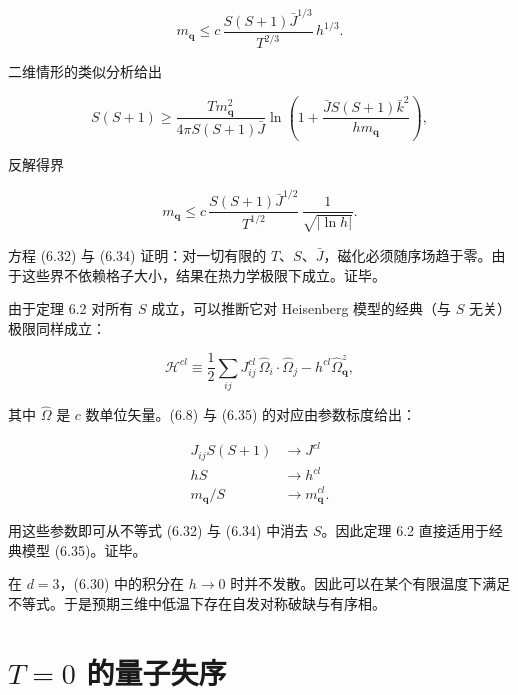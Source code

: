 \begin{equation*}
m _ {\mathbf {q}} \leq c \, \frac {S ( S + 1 ) \bar {J} ^ {1/3}}{T ^ {2/3}} \, h ^ {1/3}.
\tag{6.32}
\end{equation*}

二维情形的类似分析给出

\begin{equation*}
S ( S + 1 ) \geq \frac {T m _ {\mathbf {q}} ^ {2}}{4 \pi S ( S + 1 ) \bar {J}} \ln \left( 1 + \frac {\bar {J} S ( S + 1 ) \bar {k} ^ {2}}{h m _ {\mathbf {q}}} \right) ,
\tag{6.33}
\end{equation*}

反解得界

\begin{equation*}
m _ {\mathbf {q}} \leq c \, \frac {S ( S + 1 ) \bar {J} ^ {1/2}}{T ^ {1/2}} \, \frac {1}{\sqrt {| \ln h |}}.
\tag{6.34}
\end{equation*}

方程 (6.32) 与 (6.34) 证明：对一切有限的 $T$、$S$、$\bar{J}$，磁化必须随序场趋于零。由于这些界不依赖格子大小，结果在热力学极限下成立。证毕。

由于定理 6.2 对所有 $S$ 成立，可以推断它对 Heisenberg 模型的经典（与 $S$ 无关）极限同样成立：

\begin{equation*}
\mathcal {H} ^ {cl} \equiv \frac {1}{2} \sum_ {ij} J _ {ij} ^ {cl} \, \hat {\Omega} _ {i} \cdot \hat {\Omega} _ {j} - h ^ {cl} \hat {\Omega} _ {\mathbf {q}} ^ {z} ,
\tag{6.35}
\end{equation*}

其中 $\hat{\Omega}$ 是 $c$ 数单位矢量。(6.8) 与 (6.35) 的对应由参数标度给出：

\begin{align*}
J _ {ij} S ( S + 1 ) & \to J ^ {cl}\\
h S & \to h ^ {cl}\\
m _ {\mathbf {q}} / S & \to m _ {\mathbf {q}} ^ {cl}.
\tag{6.36}
\end{align*}

用这些参数即可从不等式 (6.32) 与 (6.34) 中消去 $S$。因此定理 6.2 直接适用于经典模型 (6.35)。证毕。

在 $d=3$，(6.30) 中的积分在 $h \rightarrow 0$ 时并不发散。因此可以在某个有限温度下满足不等式。于是预期三维中低温下存在自发对称破缺与有序相。

\section{$T = 0$ 的量子失序}

